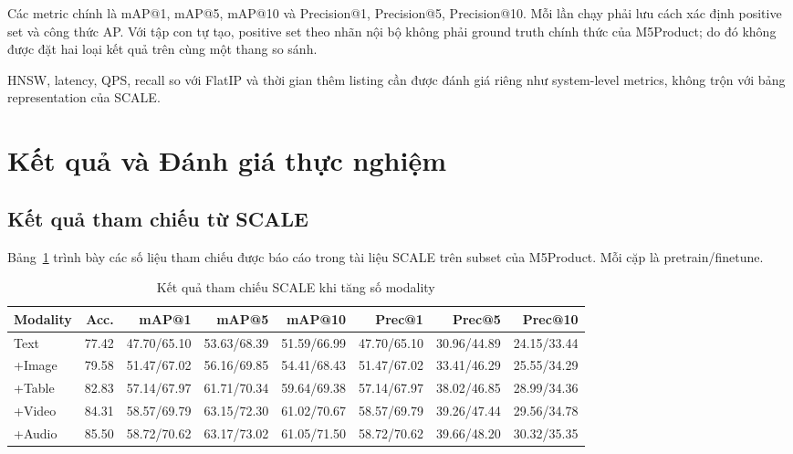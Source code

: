 \documentclass[10pt,conference]{IEEEtran}
\begin{document}
Các metric chính là mAP@1, mAP@5, mAP@10 và Precision@1, Precision@5, Precision@10. Mỗi lần chạy phải lưu cách xác định positive set và công thức AP. Với tập con tự tạo, positive set theo nhãn nội bộ không phải ground truth chính thức của M5Product; do đó không được đặt hai loại kết quả trên cùng một thang so sánh.

HNSW, latency, QPS, recall so với FlatIP và thời gian thêm listing cần được đánh giá riêng như system-level metrics, không trộn với bảng representation của SCALE.

\section{Kết quả và Đánh giá thực nghiệm}

\subsection{Kết quả tham chiếu từ SCALE}

Bảng~\ref{tab:scale-results} trình bày các số liệu tham chiếu được báo cáo trong tài liệu SCALE trên subset của M5Product. Mỗi cặp là pretrain/finetune.

\begin{table}[t]
\centering
\caption{Kết quả tham chiếu SCALE khi tăng số modality}
\label{tab:scale-results}
\small
\begin{tabular}{lrrrrrrr}
\toprule
\textbf{Modality} & \textbf{Acc.} & \textbf{mAP@1} & \textbf{mAP@5} &
\textbf{mAP@10} & \textbf{Prec@1} & \textbf{Prec@5} & \textbf{Prec@10}\\
\midrule
Text & 77.42 & 47.70/65.10 & 53.63/68.39 & 51.59/66.99 & 47.70/65.10 & 30.96/44.89 & 24.15/33.44\\
+Image & 79.58 & 51.47/67.02 & 56.16/69.85 & 54.41/68.43 & 51.47/67.02 & 33.41/46.29 & 25.55/34.29\\
+Table & 82.83 & 57.14/67.97 & 61.71/70.34 & 59.64/69.38 & 57.14/67.97 & 38.02/46.85 & 28.99/34.36\\
+Video & 84.31 & 58.57/69.79 & 63.15/72.30 & 61.02/70.67 & 58.57/69.79 & 39.26/47.44 & 29.56/34.78\\
+Audio & 85.50 & 58.72/70.62 & 63.17/73.02 & 61.05/71.50 & 58.72/70.62 & 39.66/48.20 & 30.32/35.35\\
\bottomrule
\end{tabular}
\end{table}
\end{document}
